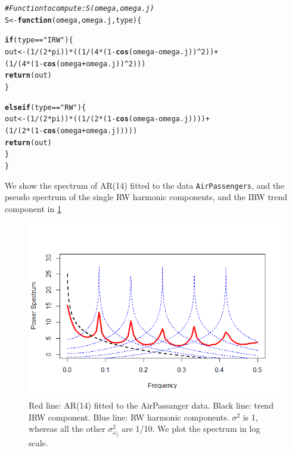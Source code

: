 \documentclass{article}\usepackage[]{graphicx}\usepackage[]{color}
\makeatletter
\newcommand{\hlnum}[1]{\textcolor[rgb]{0.686,0.059,0.569}{#1}}%
\newcommand{\hlstr}[1]{\textcolor[rgb]{0.192,0.494,0.8}{#1}}%
\newcommand{\hlcom}[1]{\textcolor[rgb]{0.678,0.584,0.686}{\textit{#1}}}%
\newcommand{\hlopt}[1]{\textcolor[rgb]{0,0,0}{#1}}%
\newcommand{\hlstd}[1]{\textcolor[rgb]{0.345,0.345,0.345}{#1}}%
\newcommand{\hlkwa}[1]{\textcolor[rgb]{0.161,0.373,0.58}{\textbf{#1}}}%
\newcommand{\hlkwb}[1]{\textcolor[rgb]{0.69,0.353,0.396}{#1}}%
\newcommand{\hlkwc}[1]{\textcolor[rgb]{0.333,0.667,0.333}{#1}}%
\newcommand{\hlkwd}[1]{\textcolor[rgb]{0.737,0.353,0.396}{\textbf{#1}}}%
\newenvironment{kframe}{%
 \def\at@end@of@kframe{}%
 \ifinner\ifhmode%
  \def\at@end@of@kframe{\end{minipage}}%
  \begin{minipage}{\columnwidth}%
 \fi\fi%
 \def\FrameCommand##1{\hskip\@totalleftmargin \hskip-\fboxsep
 \colorbox{shadecolor}{##1}\hskip-\fboxsep
     \hskip-\linewidth \hskip-\@totalleftmargin \hskip\columnwidth}%
 \MakeFramed {\advance\hsize-\width
   \@totalleftmargin\z@ \linewidth\hsize
   \@setminipage}}%
 {\par\unskip\endMakeFramed%
 \at@end@of@kframe}
\newenvironment{knitrout}{}{} %
\makeatother
\begin{document}
\begin{knitrout}\footnotesize
{}\color{fgcolor}\begin{kframe}
\begin{alltt}
\hlcom{# Function to compute: S(omega, omega.j) }
\hlstd{S} \hlkwb{<-} \hlkwa{function}\hlstd{(}\hlkwc{omega}\hlstd{,} \hlkwc{omega.j}\hlstd{,} \hlkwc{type}\hlstd{) \{}

  \hlkwa{if}\hlstd{(type} \hlopt{==} \hlstr{"IRW"}\hlstd{) \{}
    \hlstd{out} \hlkwb{<-} \hlstd{(}\hlnum{1}\hlopt{/}\hlstd{(}\hlnum{2}\hlopt{*}\hlstd{pi))} \hlopt{*} \hlstd{((}\hlnum{1}\hlopt{/}\hlstd{(}\hlnum{4}\hlopt{*}\hlstd{(}\hlnum{1} \hlopt{-} \hlkwd{cos}\hlstd{(omega} \hlopt{-} \hlstd{omega.j))}\hlopt{^}\hlnum{2}\hlstd{))} \hlopt{+}
                           \hlstd{(}\hlnum{1}\hlopt{/}\hlstd{(}\hlnum{4}\hlopt{*}\hlstd{(}\hlnum{1} \hlopt{-} \hlkwd{cos}\hlstd{(omega} \hlopt{+} \hlstd{omega.j))}\hlopt{^}\hlnum{2}\hlstd{)))}
    \hlkwd{return}\hlstd{(out)}
  \hlstd{\}}

  \hlkwa{else if} \hlstd{(type} \hlopt{==} \hlstr{"RW"}\hlstd{) \{}
    \hlstd{out} \hlkwb{<-} \hlstd{(}\hlnum{1}\hlopt{/}\hlstd{(}\hlnum{2}\hlopt{*}\hlstd{pi))} \hlopt{*} \hlstd{((}\hlnum{1}\hlopt{/}\hlstd{(}\hlnum{2}\hlopt{*}\hlstd{(}\hlnum{1} \hlopt{-} \hlkwd{cos}\hlstd{(omega} \hlopt{-} \hlstd{omega.j))))} \hlopt{+}
                           \hlstd{(}\hlnum{1}\hlopt{/}\hlstd{(}\hlnum{2}\hlopt{*}\hlstd{(}\hlnum{1} \hlopt{-} \hlkwd{cos}\hlstd{(omega} \hlopt{+} \hlstd{omega.j)))))}
    \hlkwd{return}\hlstd{(out)}
  \hlstd{\}}
\hlstd{\}}
\end{alltt}
\end{kframe}
\end{knitrout}

We show the spectrum of AR(14) fitted to the data \texttt{AirPassengers}, and
the pseudo spectrum of the single RW harmonic components, and the IRW trend component in \ref{fig:AR14airpass}

\begin{figure}[htbp]
\centering
\includegraphics[scale = 0.40]{Plots/AR14airpass.png}
\caption{Red line: AR(14) fitted to the AirPassanger data. Black line: trend IRW component. Blue line: RW harmonic components. $\sigma^2$ is 1, whereas all the other $\sigma^2_{\omega_j}$ are 1/10. We plot the spectrum in log scale.}
\label{fig:AR14airpass}
\end{figure}
\end{document}
